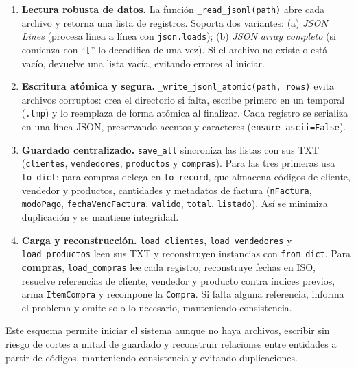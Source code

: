 \documentclass[11pt]{article}
\begin{document}
\begin{enumerate}
  \item \textbf{Lectura robusta de datos.} La función \texttt{\_read\_jsonl(path)} abre cada archivo y retorna una lista de registros. Soporta dos variantes: (a) \emph{JSON Lines} (procesa línea a línea con \texttt{json.loads}); (b) \emph{JSON array completo} (si comienza con ``\texttt{[}'' lo decodifica de una vez). Si el archivo no existe o está vacío, devuelve una lista vacía, evitando errores al iniciar.

  \item \textbf{Escritura atómica y segura.} \texttt{\_write\_jsonl\_atomic(path, rows)} evita archivos corruptos: crea el directorio si falta, escribe primero en un temporal (\texttt{.tmp}) y lo reemplaza de forma atómica al finalizar. Cada registro se serializa en una línea JSON, preservando acentos y caracteres (\texttt{ensure\_ascii=False}).

  \item \textbf{Guardado centralizado.} \texttt{save\_all} sincroniza las listas con sus TXT (\texttt{clientes}, \texttt{vendedores}, \texttt{productos} y \texttt{compras}). Para las tres primeras usa \texttt{to\_dict}; para compras delega en \texttt{to\_record}, que almacena códigos de cliente, vendedor y productos, cantidades y metadatos de factura (\texttt{nFactura}, \texttt{modoPago}, \texttt{fechaVencFactura}, \texttt{valido}, \texttt{total}, \texttt{listado}). Así se minimiza duplicación y se mantiene integridad.

  \item \textbf{Carga y reconstrucción.} \texttt{load\_clientes}, \texttt{load\_vendedores} y \texttt{load\_productos} leen sus TXT y reconstruyen instancias con \texttt{from\_dict}. Para \textbf{compras}, \texttt{load\_compras} lee cada registro, reconstruye fechas en ISO, resuelve referencias de cliente, vendedor y producto contra índices previos, arma \texttt{ItemCompra} y recompone la \texttt{Compra}. Si falta alguna referencia, informa el problema y omite solo lo necesario, manteniendo consistencia.
\end{enumerate}


Este esquema permite iniciar el sistema aunque no haya archivos, escribir sin riesgo de cortes a mitad de guardado y reconstruir relaciones entre entidades a partir de códigos, manteniendo consistencia y evitando duplicaciones.
\end{document}
